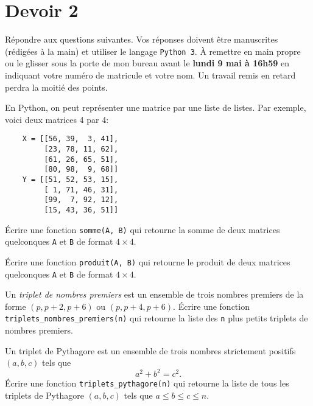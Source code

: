 



\section*{Devoir 2}

Répondre aux questions suivantes. Vos réponses doivent être manuscrites
(rédigées à la main) et utiliser le langage \texttt{Python 3}.
À remettre en main propre ou le glisser sous la porte de mon bureau avant le
\textbf{lundi 9 mai à 16h59} 
en indiquant votre numéro de matricule et votre nom. Un travail remis en
retard perdra la moitié des points.

\begin{question}[5 pts]
    En Python, on peut représenter une matrice par une liste de listes. Par
    exemple, voici deux matrices 4 par 4:
    \begin{verbatim}
    X = [[56, 39,  3, 41],
         [23, 78, 11, 62],
         [61, 26, 65, 51],
         [80, 98,  9, 68]]
    Y = [[51, 52, 53, 15],
         [ 1, 71, 46, 31],
         [99,  7, 92, 12],
         [15, 43, 36, 51]]
    \end{verbatim}
    \vspace{-1em}
    Écrire une fonction \texttt{somme(A, B)} qui retourne la somme de deux
    matrices quelconques \texttt{A} et \texttt{B} de format $4\times 4$.
\end{question}

\begin{question}[5 pts]
    Écrire une fonction \texttt{produit(A, B)} qui retourne le produit de deux
    matrices quelconques \texttt{A} et \texttt{B} de format $4\times 4$.
\end{question}

\begin{question}[5 pts]
    Un \emph{triplet de nombres premiers} est un ensemble de trois nombres
    premiers de la forme $(p, p + 2, p + 6)$ ou $(p, p + 4, p + 6)$.
    Écrire une fonction \texttt{triplets\_nombres\_premiers(n)} qui retourne
    la liste des \texttt{n} plus petits triplets de nombres premiers.
\end{question}

\begin{question}[5 pts]
    Un triplet de Pythagore est un ensemble de trois nombres strictement
    positifs $(a,b,c)$ tels que 
    \[
	a^2+b^2=c^2.
    \]
    Écrire une fonction
    \texttt{triplets\_pythagore(n)} qui retourne la liste de tous les triplets
    de Pythagore $(a,b,c)$ tels que $a\leq b\leq c\leq n$.
\end{question}




